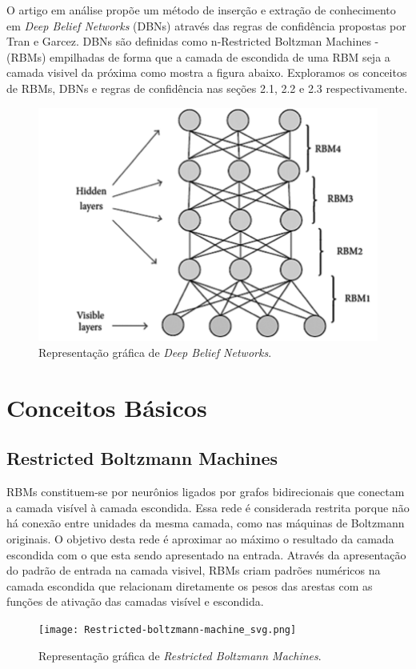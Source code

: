 \documentclass[a4paper, 12pt]{article}
\begin{document}
O artigo em análise propõe um método de inserção e extração de conhecimento em \textit{Deep Belief Networks} (DBNs) através das regras de confidência propostas por Tran e Garcez. DBNs são definidas como n-Restricted Boltzman Machines - (RBMs) empilhadas de forma que a camada de escondida de uma RBM seja a camada visivel da próxima como mostra a figura abaixo. Exploramos os conceitos de RBMs, DBNs e regras de confidência nas seções 2.1, 2.2 e 2.3 respectivamente.

\begin{figure}[h]
 \centering
 \includegraphics[scale=0.3]{Graphical-Representation-of-a-Deep-Belief-Network.png}
 \caption{Representação gráfica de \textit{Deep Belief Networks}.\cite{imagem1}}
\end{figure}

\section{Conceitos Básicos}
\subsection{Restricted Boltzmann Machines}
RBMs constituem-se por neurônios ligados por grafos bidirecionais que conectam a camada visível à camada escondida. Essa rede é considerada restrita porque não há conexão entre unidades da mesma camada, como nas máquinas de Boltzmann originais. O objetivo desta rede é aproximar ao máximo o resultado da camada escondida com o que esta sendo apresentado na entrada. Através da apresentação do padrão de entrada na camada visivel, RBMs criam padrões numéricos na camada escondida que relacionam diretamente os pesos das arestas com as funções de ativação das camadas visível e escondida. 
\begin{figure}[h]
 \centering
 \texttt{[image: Restricted-boltzmann-machine\_svg.png]}
 \caption{Representação gráfica de \textit{Restricted Boltzmann Machines}.\cite{RBM}}
\end{figure}
\end{document}
